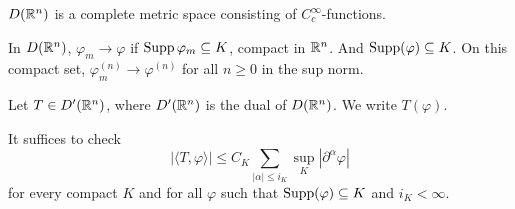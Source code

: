 $D(\mathbb{R}^n)$ is a complete metric space consisting of $C_c^\infty$-functions. 

\begin{definition}
    In $D(\mathbb{R}^n)$, $\varphi_m\to\varphi$ if $\operatorname{Supp}\varphi_m\subseteq K$, compact in $\mathbb{R}^n$. And $\operatorname{Supp}(\varphi)\subseteq K$. On this compact set, $\varphi^{(n)}_m\to \varphi^{(n)}$ for all $n\ge 0$ in the sup norm.
\end{definition}

\begin{definition}[Distributions]
    Let $T\in D'(\mathbb{R}^n)$, where $D'(\mathbb{R}^n)$ is the dual of $D(\mathbb{R}^n)$. We write $T(\varphi)$.
\end{definition}

It suffices to check 
\begin{equation*}
    |\langle T, \varphi\rangle|\le C_K\sum_{|\alpha|\le i_K}\sup_{K}|\partial^\alpha\varphi|
\end{equation*}
for every compact $K$ and for all $\varphi$ such that $\operatorname{Supp}(\varphi)\subseteq K$ and $i_K < \infty$.